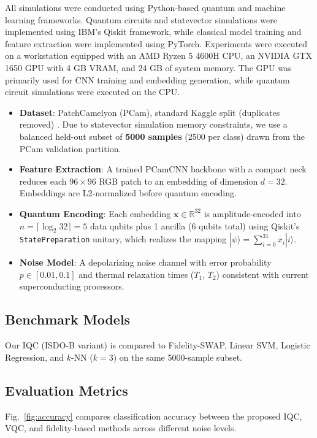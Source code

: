 \documentclass[conference]{IEEEtran}
\begin{document}
All simulations were conducted using Python-based quantum and machine learning frameworks. Quantum circuits and statevector simulations were implemented using IBM’s Qiskit framework, while classical model training and feature extraction were implemented using PyTorch. Experiments were executed on a workstation equipped with an AMD Ryzen 5 4600H CPU, an NVIDIA GTX 1650 GPU with 4 GB VRAM, and 24 GB of system memory. The GPU was primarily used for CNN training and embedding generation, while quantum circuit simulations were executed on the CPU.
\begin{itemize}
    \item \textbf{Dataset}: PatchCamelyon (PCam), standard Kaggle split (duplicates removed) \cite{pcam_veeling2018}. Due to statevector simulation memory constraints, we use a balanced held-out subset of \textbf{5000 samples} (2500 per class) drawn from the PCam validation partition.
    \item \textbf{Feature Extraction}: A trained PCamCNN backbone with a compact neck reduces each 96\,$\times$\,96 RGB patch to an embedding of dimension $d = 32$. Embeddings are L2-normalized before quantum encoding.
    \item \textbf{Quantum Encoding}: Each embedding $\mathbf{x} \in \mathbb{R}^{32}$ is amplitude-encoded into $n = \lceil \log_2 32 \rceil = 5$ data qubits plus 1 ancilla (6 qubits total) using Qiskit's \texttt{StatePreparation} unitary, which realizes the mapping $|\psi\rangle = \sum_{i=0}^{31} x_i|i\rangle$.
    \item \textbf{Noise Model}: A depolarizing noise channel with error probability $p \in [0.01, 0.1]$ and thermal relaxation times ($T_1$, $T_2$) consistent with current superconducting processors.
\end{itemize}

\subsection{Benchmark Models}
Our IQC (ISDO-B variant) is compared to Fidelity-SWAP, Linear SVM, Logistic Regression, and $k$-NN ($k=3$) on the same 5000-sample subset.

\subsection{Evaluation Metrics}
Fig.~\ref{fig:accuracy} compares classification accuracy between the proposed IQC, VQC, and fidelity-based methods across different noise levels.
\end{document}
